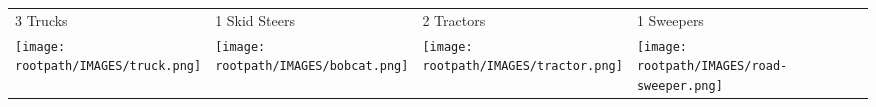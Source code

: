 \begin{tabular}{m{}m{}m{}m{}}
    {\color{ccorange} 3 Trucks} & {\color{ccorange} 1 Skid Steers} & {\color{ccorange} 2 Tractors} & {\color{ccorange} 1 Sweepers} \\
    \texttt{[image: \\rootpath/IMAGES/truck.png]}  & \texttt{[image: \\rootpath/IMAGES/bobcat.png]} & \texttt{[image: \\rootpath/IMAGES/tractor.png]} & \texttt{[image: \\rootpath/IMAGES/road-sweeper.png]}                         
    \end{tabular}